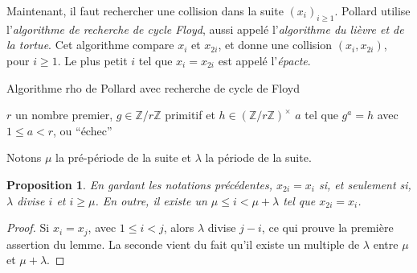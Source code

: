 \documentclass[a4paper, titlepage]{article}
\newtheorem{prop}[theo]{Proposition}
\theoremstyle{definition}
\theoremstyle{remark}
\def\Z{\mathbb Z}
\def\pgcd{\operatorname{pgcd}}
\begin{document}
Maintenant, il faut rechercher une collision dans la suite ${(x_i)}_{i\geqslant 1}$. Pollard utilise l'\textit{algorithme de recherche de cycle Floyd}, aussi appelé l'\textit{algorithme du lièvre et de la tortue}. Cet algorithme compare $x_i$ et $x_{2i}$, et donne une collision $(x_i, x_{2i})$, pour $i \geqslant 1$. Le plus petit $i$ tel que $x_i = x_{2i}$ est appelé l'\textit{épacte}. 

\begin{algorithm}[h]
\caption{Algorithme rho de Pollard avec recherche de cycle de Floyd}
\label{algoRho}
\begin{algorithmic}[1]
\REQUIRE $r$ un nombre premier, $g\in \Z/r\Z$ primitif et $h \in (\Z/r\Z)^\times$ 
\ENSURE $a$ tel que $g^a = h$ avec $1 \leqslant a < r$, ou ``échec''
\ENDWHILE
\IF{$\pgcd(b_1- b_2, r - 1) = 1$}
\ELSE
\ENDIF
\end{algorithmic}
\end{algorithm}

Notons $\mu$ la pré-période de la suite et $\lambda$ la période de la suite.

\begin{prop}\label{propFloyd}
En gardant les notations précédentes, $x_{2i} = x_i$ si, et seulement si, $\lambda$ divise $i$ et $i \geqslant \mu$. En outre, il existe un $\mu \leqslant i < \mu + \lambda$ tel que $x_{2i} = x_i$.
\end{prop}

\begin{proof}
Si $x_i = x_j$, avec $1\leqslant i < j$, alors $\lambda$ divise $j-i$, ce qui prouve la première assertion du lemme. La seconde vient du fait qu'il existe un multiple de $\lambda$ entre $\mu$ et $\mu + \lambda$.
\end{proof}
\end{document}
